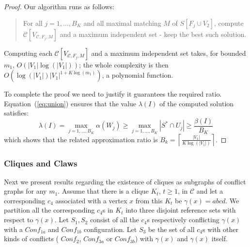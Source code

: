 \documentclass[final]{dmtcs-episciences}
\begin{document}
\begin{proof}
Our algorithm runs as follows: 
\begin{quote}
\begin{em}
For all $j=1, \ldots, B_K$ and all maximal matching $M$ of $S[F_j\cup V_2]$, compute  $\mathcal{C}[V_{\mathcal{C},F_j,M}]$ and a maximum independent set  \-- keep the best such solution. 
\end{em}
\end{quote}
\noindent
Computing each $\mathcal{C}[V_{\mathcal{C},F_j,M}]$ and a maximum independent set takes, for bounded $m_1$, $O\left(|V_1|\log(|V_1|)\right)$;  the whole complexity is then
$O\left(\log(|V_1|) |V_1|^{1+K\log(m_1)}\right)$, a polynomial function.
 
To complete the proof we need to justify it guarantees the required ratio. Equation~(\ref{eq:union}) ensures that the value $\lambda(I)$ of the computed solution satisfies:
$$
\lambda(I)=\max\limits_{j=1, \ldots, B_K}\alpha(W_j)\geq \max\limits_{j=1, \ldots, B_K}|S^*\cap U_j|\geq \frac{\beta(I)}{B_K}
$$
which shows that the related approximation ratio is $B_k=\left\lceil \frac{|V_1|}{K\log(|V_1|)}\right\rceil$. 
\end{proof}





\subsubsection{Cliques and Claws}\label{subsub:cc}

Next we present results regarding the existence of cliques as subgraphs of conflict graphs
for any $m_1$.
Assume that there is a clique $K_t$, $t\geq 1$, in $\mathcal{C}$ and let a corresponding $c_4$ associated with a vertex $x$ from this $K_t$ be $\gamma(x)=abcd$.
We partition all the corresponding $c_4$s in $K_t$ into three disjoint reference sets with respect to $\gamma(x)$.
Let $S_1, S_2$ consist of all the $c_4$s respectively conflicting $\gamma(x)$ with a  $Conf_{1a}$ and $Conf_{1b}$ configuration. 
Let $S_3$ be the set of all $c_4$s 
with other kinds of conflicts ( $Conf_{2}$, $Conf_{3a}$ or $Conf_{3b}$) with $\gamma(x)$ and $\gamma(x)$ itself.  
\end{document}
